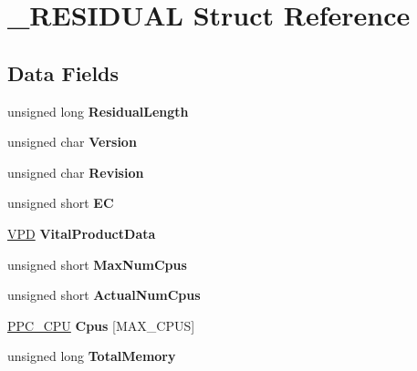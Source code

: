 \hypertarget{struct__RESIDUAL}{}\section{\+\_\+\+R\+E\+S\+I\+D\+U\+AL Struct Reference}
\label{struct__RESIDUAL}
\subsection*{Data Fields}
\begin{DoxyCompactItemize}
\item 
\mbox{\label{struct__RESIDUAL_a0198fb96e455eb504e466a94a908e9c0}} 
unsigned long {\bfseries Residual\+Length}
\item 
\mbox{\label{struct__RESIDUAL_a5bf73a57b3f51f2d197bfc23b3d0be6d}} 
unsigned char {\bfseries Version}
\item 
\mbox{\label{struct__RESIDUAL_aefbd916fc7cdd851aa22052196ca85f0}} 
unsigned char {\bfseries Revision}
\item 
\mbox{\label{struct__RESIDUAL_af0f8dd50eda0e216d8cf0d748b5f1ec3}} 
unsigned short {\bfseries EC}
\item 
\mbox{\label{struct__RESIDUAL_a9a19a5e985cdf66bf683e6fc69d429ff}} 
\mbox{\hyperlink{struct__VPD}{V\+PD}} {\bfseries Vital\+Product\+Data}
\item 
\mbox{\label{struct__RESIDUAL_a08c4585ec6b47dcf89c697351159658e}} 
unsigned short {\bfseries Max\+Num\+Cpus}
\item 
\mbox{\label{struct__RESIDUAL_af2233c3bfb5c2731395b7297d68feb4c}} 
unsigned short {\bfseries Actual\+Num\+Cpus}
\item 
\mbox{\label{struct__RESIDUAL_ac24e65de8389e8bfa7e3e21774ba283c}} 
\mbox{\hyperlink{struct__PPC__CPU}{P\+P\+C\+\_\+\+C\+PU}} {\bfseries Cpus} \mbox{[}M\+A\+X\+\_\+\+C\+P\+US\mbox{]}
\item 
\mbox{\label{struct__RESIDUAL_a30aad818162e09fecd563a5b07b9c8f2}} 
unsigned long {\bfseries Total\+Memory}

\end{DoxyCompactItemize}
